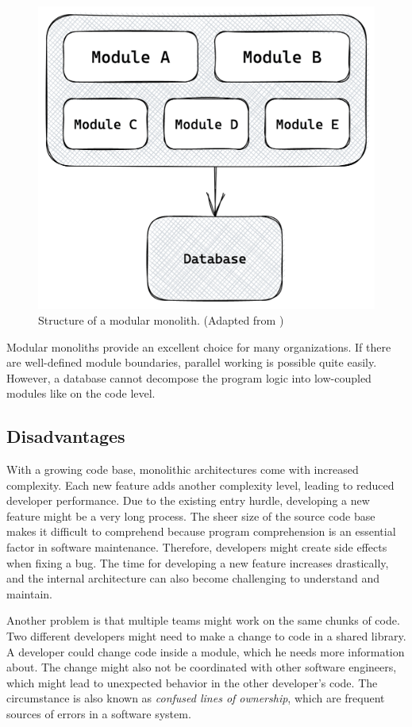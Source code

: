 \ifshowImages
\begin{figure}[H]
    \centering
    \includegraphics[width=0.4\linewidth]{images/background/monolith/modular-monolith-sketch.png}
    \caption{Structure of a modular monolith. (Adapted from \cite[13]{book:2019:newman:background:monolith:monolith-to-microservices})}\label{fig:background:monolith:module-monolith-sketch}
\end{figure}
\fi

\noindent Modular monoliths provide an excellent choice for many organizations. If there are well-defined module boundaries, parallel working is possible quite easily. However, a database cannot decompose the program logic into low-coupled modules like on the code level. \cite[12-13]{book:2019:newman:background:monolith:monolith-to-microservices}

\subsection{Disadvantages}\label{subsection:background:software-monolith:disadvantages}

With a growing code base, monolithic architectures come with increased complexity. Each new feature adds another complexity level, leading to reduced developer performance. Due to the existing entry hurdle, developing a new feature might be a very long process. The sheer size of the source code base makes it difficult to comprehend because program comprehension is an essential factor in software maintenance. \cite{article:1995:mayrhauser:background:monoliths:program-comprehension-during-software-maintenance-and-evolution} Therefore, developers might create side effects when fixing a bug. The time for developing a new feature increases drastically, and the internal architecture can also become challenging to understand and maintain. \cite[4-6]{book:2018:richardson:background:bff:microservices-patterns}

\bigskip

\noindent Another problem is that multiple teams might work on the same chunks of code. Two different developers might need to make a change to code in a shared library. A developer could change code inside a module, which he needs more information about. The change might also not be coordinated with other software engineers, which might lead to unexpected behavior in the other developer's code. The circumstance is also known as \textit{confused lines of ownership}, which are frequent sources of errors in a software system. \cite[15]{book:2019:newman:background:monolith:monolith-to-microservices} \cite[7]{inproceedings:2011:bird:background:monoliths:dont-touch-my-code}


